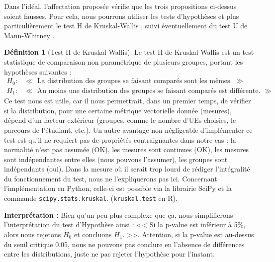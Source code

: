 \documentclass{rapport}
\theoremstyle{definition}
\newtheorem{definition}{Définition}
\theoremstyle{remark}
\theoremstyle{plain}
\theoremstyle{definition}
\theoremstyle{definition}
\theoremstyle{remark}
\theoremstyle{definition}
\begin{document}
Dans l'idéal, l'affectation proposée vérifie que les trois propositions ci-dessus soient fausses. Pour cela, nous pourrons utiliser les tests d'hypothèses et plus particulièrement le test H de Kruskal-Wallis \cite{Kruskal1952}, suivi éventuellement du test U de Mann-Whitney \cite{Whitney1947}.
\begin{definition}[Test H de Kruskal-Wallis]
    Le test H de Kruskal-Wallis est un test statistique de comparaison non paramétrique de plusieurs groupes, portant les hypothèses suivantes :
    $$
    \begin{matrix}
        H_0 : & \ll\text{ La distribution des groupes se faisant comparés sont les mêmes. } \gg\\
        H_1 : & \ll\text{ Au moins une distribution des groupes se faisant comparés est différente. }\gg
    \end{matrix}
    $$
    Ce test nous est utile, car il nous permettrait, dans un premier temps, de vérifier si la distribution, pour une certaine métrique vectorielle donnée (mesures), dépend d'un facteur extérieur (groupes, comme le nombre d'UEs choisies, le parcours de l'étudiant, etc.).
    Un autre avantage non négligeable d'implémenter ce test est qu'il ne requiert pas de propriétés contraignantes dans notre cas : la normalité n'est pas assumée (OK), les mesures sont continues (OK), les mesures sont indépendantes entre elles (nous pouvons l'assumer), les groupes sont indépendants (oui).
    Dans la mesure où il serait trop lourd de rédiger l'intégralité du fonctionnement du test, nous ne l'expliquerons pas ici. Concernant l'implémentation en Python, celle-ci est possible via la librairie SciPy et la commande \texttt{scipy.stats.kruskal}. (\texttt{kruskal.test} en R).

    \textbf{Interprétation :} Bien qu'un peu plus complexe que ça, nous simplifierons l'interprétation du test d'Hypothèse ainsi : << Si la p-value est inférieur à 5\%, alors nous rejetons $H_0$ et concluons $H_1$. >>. Attention, si la p-value est au-dessus du seuil critique 0.05, nous ne pouvons pas conclure en l'absence de différences entre les distributions, juste ne pas rejeter l'hypothèse pour l'instant.
\end{definition}
\end{document}
